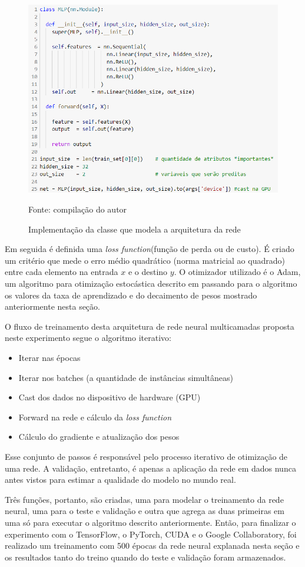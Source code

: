 \begin{figure}[h!]
	\centering
	\includegraphics[width=.6\textwidth]{imagens/mlp-pytorch.png}
	\caption{Implementação da classe que modela a arquitetura da rede}
	\label{fig:mlp-pytorch}
	{\scriptsize Fonte: compilação do autor}
\end{figure}

Em seguida é definida uma \textit{loss function}(função de perda ou de custo). É criado um critério que mede o erro médio quadrático (norma matricial ao quadrado) entre cada elemento na entrada $x$ e o destino $y$. O otimizador utilizado é o Adam, um algoritmo para otimização estocástica descrito em \cite{adam_2017} passando para o algoritmo os valores da taxa de aprendizado e do decaimento de pesos mostrado anteriormente nesta seção.

O fluxo de treinamento desta arquitetura de rede neural multicamadas proposta neste experimento segue o algoritmo iterativo:

\begin{itemize}
	\item Iterar nas épocas
	\item Iterar nos batches (a quantidade de instâncias simultâneas)
	\item Cast dos dados no dispositivo de hardware (GPU)
	\item Forward na rede e cálculo da \textit{loss function}
	\item Cálculo do gradiente e atualização dos pesos
\end{itemize}

Esse conjunto de passos é responsável pelo processo iterativo de otimização de uma rede. A validação, entretanto, é apenas a aplicação da rede em dados nunca antes vistos para estimar a qualidade do modelo no mundo real.

Três funções, portanto, são criadas, uma para modelar o treinamento da rede neural, uma para o teste e validação e outra que agrega as duas primeiras em uma só para executar o algoritmo descrito anteriormente. Então, para finalizar o experimento com o TensorFlow, o PyTorch, CUDA e o Google Collaboratory, foi realizado um treinamento com 500 épocas da rede neural explanada nesta seção e os resultados tanto do treino quando do teste e validação foram armazenados.

